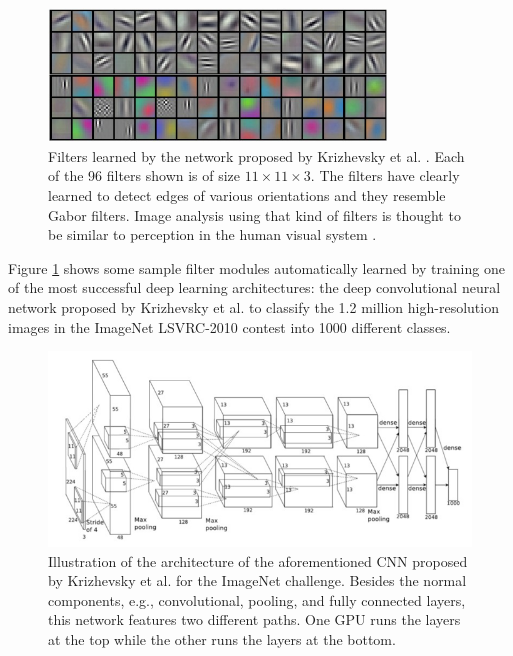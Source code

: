 \begin{figure}[!b]
	\centering
	\includegraphics[width=0.8\textwidth]{Figures/ObjRecog/weights}
	\caption{Filters learned by the network proposed by Krizhevsky et al. \cite{Krizhevsky2012}. Each of the 96 filters shown is of size $11\times11\times3$. The filters have clearly learned to detect edges of various orientations and they resemble Gabor filters. Image analysis using that kind of filters is thought to be similar to perception in the human visual system \cite{Marvcelja1980}.}
	\label{fig:alexnet_weights}
\end{figure}

Figure \ref{fig:alexnet_weights} shows some sample filter modules automatically learned by training one of the most successful deep learning architectures: the deep convolutional neural network proposed by Krizhevsky et al. \cite{Krizhevsky2012} to classify the \num{1.2} million high-resolution images in the ImageNet LSVRC-2010 \cite{Berg2010} contest into \num{1000} different classes.

\begin{figure}[!b]
	\centering
    \includegraphics[width=\linewidth]{Figures/ObjRecog/alexnet}
	\caption{Illustration of the architecture of the aforementioned \ac{CNN} proposed by Krizhevsky et al.\cite{Krizhevsky2012} for the ImageNet challenge. Besides the normal components, e.g., convolutional, pooling, and fully connected layers, this network features two different paths. One \ac{GPU} runs the layers at the top while the other runs the layers at the bottom.}
	\label{fig:convnet_architecture}
\end{figure}

